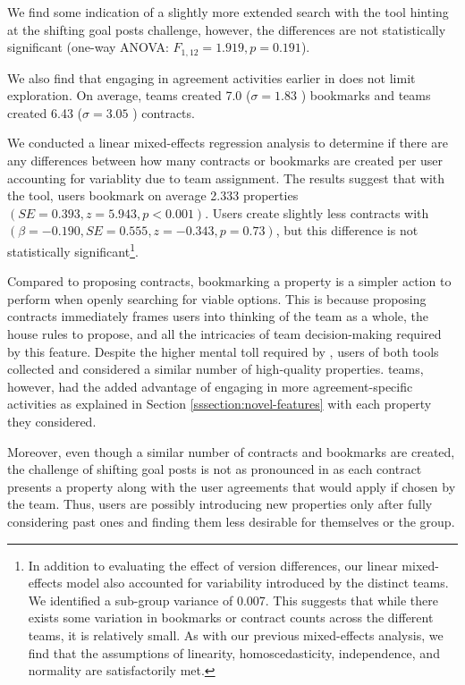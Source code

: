 We find some indication of a slightly more extended search with the \baseline tool hinting at the shifting goal posts challenge, however, the differences are not statistically significant (one-way ANOVA: $F_{1, 12} = 1.919, p = 0.191$).

We also find that engaging in agreement activities earlier in \tool does not limit exploration. On average, \baseline teams created 7.0 ($\sigma = 1.83$ 
) bookmarks  and \tool teams created 6.43 ($\sigma = 3.05$ 
) contracts.

 We conducted a linear mixed-effects regression analysis to determine if there are any differences between how many contracts or bookmarks are created per user accounting for variablity due to team assignment. The results suggest that with the \baseline tool, users bookmark on average 2.333 properties $(SE = 0.393, z = 5.943, p < 0.001)$. Users create slightly less contracts with \tool $(\beta = -0.190, SE=0.555, z = -0.343, p=0.73)$, but this difference is not statistically significant\footnote{In addition to evaluating the effect of version differences, our linear mixed-effects model also accounted for variability introduced by the distinct teams. We identified a sub-group variance of 0.007. This suggests that while there exists some variation in bookmarks or contract counts across the different teams, it is relatively small. As with our previous mixed-effects analysis, we find that the assumptions of linearity, homoscedasticity, independence, and normality are satisfactorily met.}. 
 
 Compared to proposing contracts, bookmarking a property is a simpler action to perform when openly searching for viable options. This is because proposing contracts immediately frames users into thinking of the team as a whole, the house rules to propose, and all the intricacies of team decision-making required by this feature. Despite the higher mental toll required by \tool, users of both tools collected and considered a similar number of high-quality properties. \tool teams, however, had the added advantage of engaging in more agreement-specific activities as explained in Section \ref{sssection:novel-features} with each property they considered. 

 Moreover, even though a similar number of contracts and bookmarks are created, the challenge of shifting goal posts is not as pronounced in \tool as each contract presents a property along with the user agreements that would apply if chosen by the team. Thus, users are possibly introducing new properties only after fully considering past ones and finding them less desirable for themselves or the group.
 

